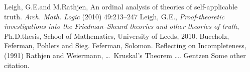 \documentclass[UKenglish,cleveref,DIV=12]{scrartcl}
\theoremstyle{definition}
\theoremstyle{definition}
\begin{document}

\begin{thebibliography}{10}
	 Leigh, G.E.\@ and M.\@ Rathjen, An ordinal analysis of theories of self-applicable truth. \emph{Arch. Math. Logic} (2010) 49:213–247
	 Leigh, G.E., \emph{Proof-theoretic investigations into the Friedman--Sheard theories and other theories of truth}, Ph.D.\@ thesis, School of Mathematics, University of Leeds, 2010.
	 Buccholz, Feferman, Pohlers and Sieg.
	 Feferman, Solomon. Reflecting on Incompleteness, (1991)
	 Rathjen and Weiermann, \dots\ Kruskal's Theorem \dots.
	 Gentzen
	 Some other citation.
\end{thebibliography}

\end{document}
